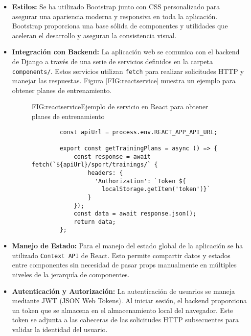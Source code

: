 \begin{itemize}
    \item \textbf{Estilos:} Se ha utilizado Bootstrap junto con CSS personalizado para asegurar una apariencia moderna y responsiva en toda la aplicación. Bootstrap proporciona una base sólida de componentes y utilidades que aceleran el desarrollo y aseguran la consistencia visual.

    \item \textbf{Integración con Backend:} La aplicación web se comunica con el backend de Django a través de una serie de servicios definidos en la carpeta \texttt{components/}. Estos servicios utilizan \texttt{fetch} para realizar solicitudes HTTP y manejar las respuestas. Figura \ref{FIG:reactservice} muestra un ejemplo para obtener planes de entrenamiento.
    \begin{figure}[Ejemplo Servicio React]{FIG:reactservice}{Ejemplo de servicio en React para obtener planes de entrenamiento}
    \begin{verbatim}
        const apiUrl = process.env.REACT_APP_API_URL;

        export const getTrainingPlans = async () => {
            const response = await fetch(`${apiUrl}/sport/trainings/` {
                headers: {
                  'Authorization': `Token ${
                    localStorage.getItem('token')}`
                }
            });
            const data = await response.json();
            return data;
        };
    \end{verbatim}
    \end{figure}

    \item \textbf{Manejo de Estado:} Para el manejo del estado global de la aplicación se ha utilizado \texttt{Context API} de React. Esto permite compartir datos y estados entre componentes sin necesidad de pasar props manualmente en múltiples niveles de la jerarquía de componentes.

    \item \textbf{Autenticación y Autorización:} La autenticación de usuarios se maneja mediante JWT (JSON Web Tokens). Al iniciar sesión, el backend proporciona un token que se almacena en el almacenamiento local del navegador. Este token se adjunta a las cabeceras de las solicitudes HTTP subsecuentes para validar la identidad del usuario.

\end{itemize}